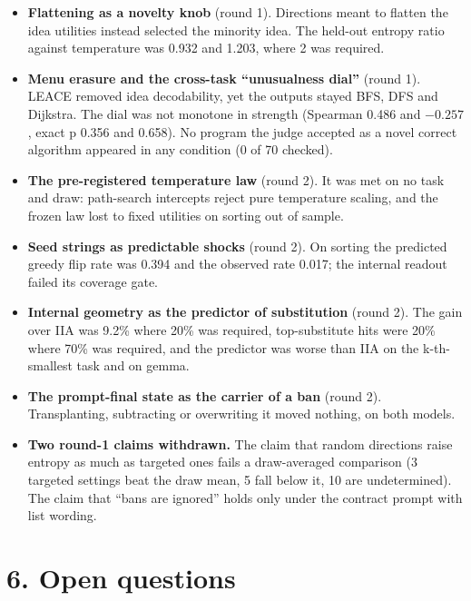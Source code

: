 \documentclass[10pt,letterpaper]{article}
\begin{document}
\begin{itemize}\setlength{\itemsep}{1pt}
\item \textbf{Flattening as a novelty knob} (round 1). Directions meant to flatten the idea utilities instead selected the minority idea. The held-out entropy ratio against temperature was 0.932 and 1.203, where 2 was required.
\item \textbf{Menu erasure and the cross-task ``unusualness dial''} (round 1). LEACE removed idea decodability, yet the outputs stayed BFS, DFS and Dijkstra. The dial was not monotone in strength (Spearman 0.486 and $-0.257$, exact p 0.356 and 0.658). No program the judge accepted as a novel correct algorithm appeared in any condition (0 of 70 checked).
\item \textbf{The pre-registered temperature law} (round 2). It was met on no task and draw: path-search intercepts reject pure temperature scaling, and the frozen law lost to fixed utilities on sorting out of sample.
\item \textbf{Seed strings as predictable shocks} (round 2). On sorting the predicted greedy flip rate was 0.394 and the observed rate 0.017; the internal readout failed its coverage gate.
\item \textbf{Internal geometry as the predictor of substitution} (round 2). The gain over IIA was 9.2\% where 20\% was required, top-substitute hits were 20\% where 70\% was required, and the predictor was worse than IIA on the k-th-smallest task and on gemma.
\item \textbf{The prompt-final state as the carrier of a ban} (round 2). Transplanting, subtracting or overwriting it moved nothing, on both models.
\item \textbf{Two round-1 claims withdrawn.} The claim that random directions raise entropy as much as targeted ones fails a draw-averaged comparison (3 targeted settings beat the draw mean, 5 fall below it, 10 are undetermined). The claim that ``bans are ignored'' holds only under the contract prompt with list wording.
\end{itemize}

\section*{6. Open questions}
\end{document}
